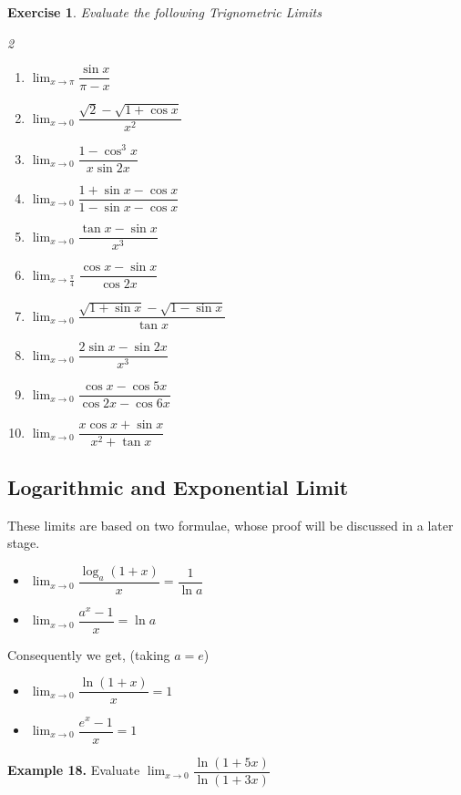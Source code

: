 \documentclass[../../main.tex]{subfiles}
\newtheorem{exercise}{Exercise}[section]
\begin{document}
\begin{exercise}
Evaluate the following Trignometric Limits
\begin{multicols}{2}
\begin{enumerate}
    \item $\lim_{x \rightarrow \pi}\dfrac{\sin {x}}{\pi-x}$
    \item $\lim_{x \rightarrow 0} \dfrac{\sqrt{2}-\sqrt{1+\cos x}}{x^2}$
    \item $\lim_{x \rightarrow 0} \dfrac{1-\cos^3 x}{x \sin 2x}$
    \item $\lim_{x \rightarrow 0} \dfrac{1+\sin x-\cos x}{1-\sin x-\cos x}$
    \item $\lim_{x \rightarrow 0} \dfrac{\tan x-\sin x}{x^3}$
    \item $\lim_{x \rightarrow \frac{\pi}{4}} \dfrac{\cos x-\sin x}{\cos 2x}$
    \item $\lim_{x \rightarrow 0}\dfrac{\sqrt{1+\sin x}-\sqrt{1-\sin x}}{\tan x}$
    \item $\lim_{x \rightarrow 0}\dfrac{2\sin x-\sin 2x}{x^3}$
    \item $\lim_{x \rightarrow 0}\dfrac{\cos x-\cos 5x}{\cos 2x-\cos 6x}$
    \item $\lim_{x \rightarrow 0}\dfrac{x\cos x+\sin x}{x^2+\tan x}$
\end{enumerate}
\end{multicols}
\end{exercise}


\subsection{Logarithmic and Exponential Limit}

These limits are based on two formulae, whose proof will be discussed in a later stage.
\begin{itemize}
    \item $\lim_{x\rightarrow 0}\dfrac{\log_a(1+x)}{x} = \dfrac{1}{\ln a}$
    \item $\lim_{x\rightarrow 0}\dfrac{a^x-1}{x} = \ln a$
\end{itemize}
Consequently we get, (taking $a = e$) \begin{itemize}
    \item $\lim_{x\rightarrow 0}\dfrac{\ln (1+x)}{x} = 1$
    \item $\lim_{x\rightarrow 0}\dfrac{e^x-1}{x} = 1$
\end{itemize}

\vspace{0.2cm}
\textbf{Example 18.}
\vspace{0.2cm}
Evaluate $\lim_{x\rightarrow 0}\dfrac{\ln(1+5x)}{\ln(1+3x)}$
\end{document}
